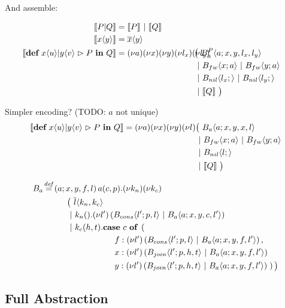 
And assemble:

\begin{align*}
  \encMJtoAP{P \jpar Q}
  &= \encMJtoAP{P} \apar \encMJtoAP{Q}
  \\
  \encMJtoAP{\jsnd{x}{y}}
  &= \asnd{x}{y}
  \\
  \encMJtoAP{\jdef{\jrct{\jrcv{x}{u} \jpat \jrcv{y}{v}}{P}}{Q}}
  &=
  \anew{a}{\anew{x}{\anew{y}{\anew{l_x}{\anew{l_y}{
    \hspace{-1cm}&&\big(\ \ains{B_a^P}{a}{x, y, l_x, l_y} \\ %
    &&&\apar \ains{B_{fw}}{x}{a} \apar \ains{B_{fw}}{y}{a} \\
    &&&\apar \ains{B_{nil}}{l_x}{} \apar \ains{B_{nil}}{l_y}{} \\
    &&&\apar \encMJtoAP{Q}\ \big)
  }}}}}
\end{align*}


Simpler encoding? (TODO: $a$ not unique)
\begin{align*}
  \encMJtoAP{\jdef{\jrct{\jrcv{x}{u} \jpat \jrcv{y}{v}}{P}}{Q}}
  = \anew{a}{\anew{x}{\anew{y}{\anew{l}{
    &\big(\ \ains{B_a}{a}{x, y, x, l} \\
    &\apar \ains{B_{fw}}{x}{a} \apar \ains{B_{fw}}{y}{a} \\
    &\apar \ains{B_{nil}}{l}{} \\
    &\apar \encMJtoAP{Q}
  \ \big)}}}} \\
\end{align*}

\begin{align*}
  \adef*{B_a}{a}{x,y,f,l}{\arcv{a}{c,p} . \anew{k_n}{\anew{k_c}{
  \\ & \hspace{1cm}
    \big(\ \asnd{l}{k_n,k_c}
  \\ & \hspace{1cm}
    \apar \arcv{k_n}{} . \anew{l'}{\parens{\ains{B_{cons}}{l'}{p, l} \apar \ains{B_a}{a}{x, y, c, l'}}}
  \\ & \hspace{1cm}
    \apar \arcv{k_c}{h,t} . \acse{c}{\right.
  \\ & \hspace{3cm}
    \aalt{f}{\anew{l'}{\parens{\ains{B_{cons}}{l'}{p, l} \apar \ains{B_a}{a}{x, y, f, l'}}}},
  \\ & \hspace{3cm}
    \aalt{x}{\anew{l'}{\parens{\ains{B_{join}}{l'}{p, h, t} \apar \ains{B_a}{a}{x, y, f, l'}}}}
  \\ & \hspace{3cm}
    \aalt{y}{\anew{l'}{\parens{\ains{B_{join}}{l'}{p, h, t} \apar \ains{B_a}{a}{x, y, f, l'}}}}
    \left.}\big)
  }}} \\
\end{align*}





\subsection{Full Abstraction}

